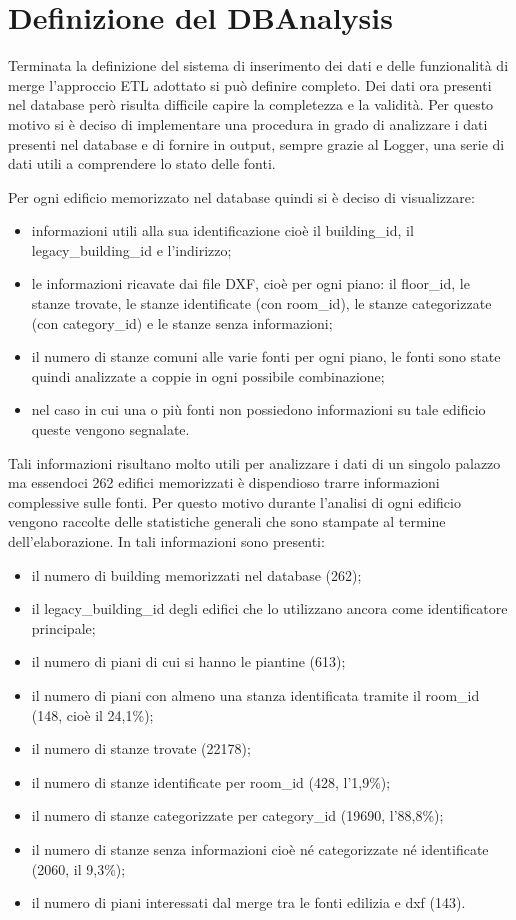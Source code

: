 \documentclass[12pt]{report}
\begin{document}
\newpage
\section{Definizione del DBAnalysis}

Terminata la definizione del sistema di inserimento dei dati e delle funzionalità di merge l'approccio ETL adottato si può definire completo.
Dei dati ora presenti nel database però risulta difficile capire la completezza e la validità.
Per questo motivo si è deciso di implementare una procedura in grado di analizzare i dati presenti nel database e di fornire in output, sempre grazie al Logger, una serie di dati utili a comprendere lo stato delle fonti.

Per ogni edificio memorizzato nel database quindi si è deciso di visualizzare:
\begin{itemize}
\item informazioni utili alla sua identificazione cioè il building\_id, il legacy\_building\_id e l'indirizzo;
\item le informazioni ricavate dai file DXF, cioè per ogni piano: il floor\_id, le stanze trovate, le stanze identificate (con room\_id), le stanze categorizzate (con category\_id) e le stanze senza informazioni;
\item il numero di stanze comuni alle varie fonti per ogni piano, le fonti sono state quindi analizzate a coppie in ogni possibile combinazione; 
\item nel caso in cui una o più fonti non possiedono informazioni su tale edificio queste vengono segnalate.
\end{itemize}

Tali informazioni risultano molto utili per analizzare i dati di un singolo palazzo ma essendoci 262 edifici memorizzati è dispendioso trarre informazioni complessive sulle fonti.
Per questo motivo durante l'analisi di ogni edificio vengono raccolte delle statistiche generali che sono stampate al termine dell'elaborazione.
In tali informazioni sono presenti:
\begin{itemize}
\item il numero di building memorizzati nel database (262);
\item il legacy\_building\_id degli edifici che lo utilizzano ancora come identificatore principale;
\item il numero di piani di cui si hanno le piantine (613);
\item il numero di piani con almeno una stanza identificata tramite il room\_id (148, cioè il 24,1\%);
\item il numero di stanze trovate (22178);
\item il numero di stanze identificate per room\_id (428, l'1,9\%);
\item il numero di stanze categorizzate per category\_id (19690, l'88,8\%);
\item il numero di stanze senza informazioni cioè né categorizzate né identificate (2060, il 9,3\%);
\item il numero di piani interessati dal merge tra le fonti edilizia e dxf (143).
\end{itemize}
\end{document}
